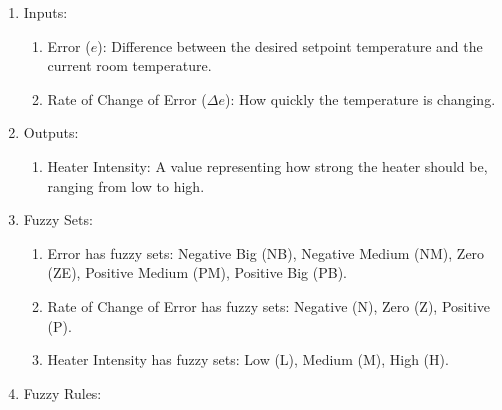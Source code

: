 \documentclass[12pt,a4paper, brazil]{article}
\begin{document}
\begin{enumerate}
  
  \item  Inputs:

  \begin{enumerate}
    \item Error ($e$): Difference between the desired setpoint temperature and the current room temperature.
    \item Rate of Change of Error ($\Delta e$): How quickly the temperature is changing.
  \end{enumerate}

  \item Outputs:

  \begin{enumerate}
    \item Heater Intensity: A value representing how strong the heater should be, ranging from low to high.
  \end{enumerate}

  \item Fuzzy Sets:

  \begin{enumerate}
    \item   Error has fuzzy sets: Negative Big (NB), Negative Medium (NM), Zero (ZE), Positive Medium (PM), Positive Big (PB).
    \item Rate of Change of Error has fuzzy sets: Negative (N), Zero (Z), Positive (P).
    \item Heater Intensity has fuzzy sets: Low (L), Medium (M), High (H).
  \end{enumerate}

  \item Fuzzy Rules:


\end{enumerate}
\end{document}
